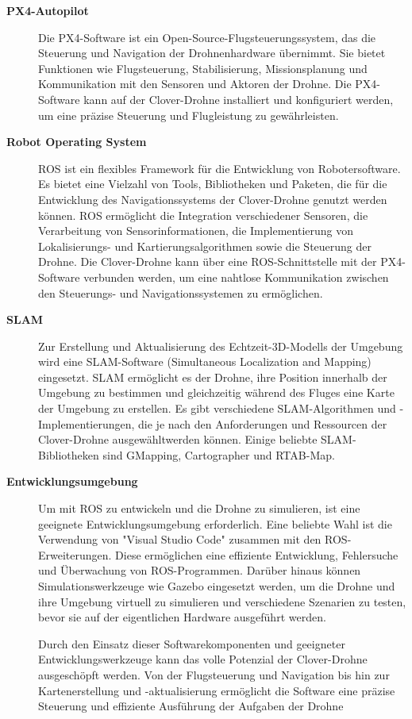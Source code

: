 \begin{description}
    \item[\textbf{PX4-Autopilot}] Die PX4-Software ist ein Open-Source-Flugsteuerungssystem, das die Steuerung und Navigation der Drohnenhardware übernimmt. Sie bietet Funktionen wie Flugsteuerung, Stabilisierung, Missionsplanung und Kommunikation mit den Sensoren und Aktoren der Drohne. Die PX4-Software kann auf der Clover-Drohne installiert und konfiguriert werden, um eine präzise Steuerung und Flugleistung zu gewährleisten.
    
    \item[\textbf{Robot Operating System}]ROS ist ein flexibles Framework für die Entwicklung von Robotersoftware. Es bietet eine Vielzahl von Tools, Bibliotheken und Paketen, die für die Entwicklung des Navigationssystems der Clover-Drohne genutzt werden können. ROS ermöglicht die Integration verschiedener Sensoren, die Verarbeitung von Sensorinformationen, die Implementierung von Lokalisierungs- und Kartierungsalgorithmen sowie die Steuerung der Drohne. Die Clover-Drohne kann über eine ROS-Schnittstelle mit der PX4-Software verbunden werden, um eine nahtlose Kommunikation zwischen den Steuerungs- und Navigationssystemen zu ermöglichen.
    \item[\textbf{\ac{SLAM}}] Zur Erstellung und Aktualisierung des Echtzeit-3D-Modells der Umgebung wird eine SLAM-Software (Simultaneous Localization and Mapping) eingesetzt. SLAM ermöglicht es der Drohne, ihre Position innerhalb der Umgebung zu bestimmen und gleichzeitig während des Fluges eine Karte der Umgebung zu erstellen. Es gibt verschiedene SLAM-Algorithmen und -Implementierungen, die je nach den Anforderungen und Ressourcen der Clover-Drohne ausgewähltwerden können. Einige beliebte SLAM-Bibliotheken sind GMapping, Cartographer und RTAB-Map.
    
    \item[\textbf{Entwicklungsumgebung}]  Um mit ROS zu entwickeln und die Drohne zu simulieren, ist eine geeignete Entwicklungsumgebung erforderlich. Eine beliebte Wahl ist die Verwendung von "Visual Studio Code" zusammen mit den ROS-Erweiterungen. Diese ermöglichen eine effiziente Entwicklung, Fehlersuche und Überwachung von ROS-Programmen. Darüber hinaus können Simulationswerkzeuge wie Gazebo eingesetzt werden, um die Drohne und ihre Umgebung virtuell zu simulieren und verschiedene Szenarien zu testen, bevor sie auf der eigentlichen Hardware ausgeführt werden.

    Durch den Einsatz dieser Softwarekomponenten und geeigneter Entwicklungswerkzeuge kann das volle Potenzial der Clover-Drohne ausgeschöpft werden. Von der Flugsteuerung und Navigation bis hin zur Kartenerstellung und -aktualisierung ermöglicht die Software eine präzise Steuerung und effiziente Ausführung der Aufgaben der Drohne
     
\end{description}

